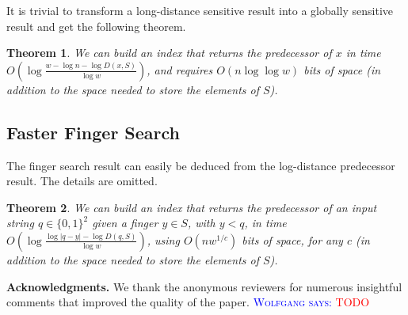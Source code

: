 \documentclass[a4paper,11pt]{article}
\newtheorem{theorem}{Theorem}[section]
\newcommand{\?}{\mskip1.5mu}
\newcommand{\aremark}[3]{\textcolor{blue}{\textsc{#1 #2:}}
  \textcolor{red}{\textsf{#3}}}
\newcommand{\wolfgang}[2][says]{\aremark{Wolfgang}{#1}{#2}}
\begin{document}
It is trivial to transform a long-distance sensitive result into a globally sensitive result and get the following theorem. 
\begin{theorem}
\label{thm:pred-long2}
We can build an index that returns the predecessor of $x$
in time $O(\log\frac{w-\log n-\log D(x,S)}{\log w})$, and requires $O(n \log\log w )$
bits of space (in addition to the space needed to store the elements of $S$).
\end{theorem}

\subsection{Faster Finger Search}
The finger search result can easily be deduced 
from the log-distance predecessor result. The details are omitted. 
\begin{theorem}
\label{th:finger_faster}
We can build an index that returns the predecessor 
of an input string $q \in \{0, 1\}^2$ given
a finger $y \in S$, with $y < q$, 
in time $O(\log\frac{\log|q - y|-\log D(q, S)}{\log w})$, using  
$O(n w^{1/c})$ bits 
of space, for any $c$ 
(in addition to the space needed to store the elements of $S$).
\end{theorem}



\bigskip
\noindent\textbf{Acknowledgments.}
We thank the anonymous reviewers for numerous
insightful comments that improved the quality of the paper.
\wolfgang{TODO}





\end{document}
